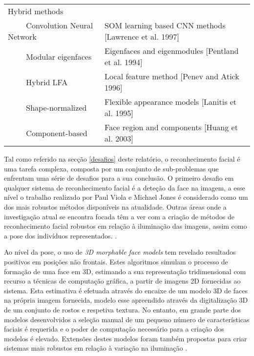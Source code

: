 \begin{center}
\begin{table}
\begin{tabular}{l p{8cm}}
Hybrid methods \\
$\qquad$        Convolution Neural Network & SOM learning based CNN methods [Lawrence et al. 1997] \\ 
$\qquad$        Modular eigenfaces         & Eigenfaces and eigenmodules [Pentland et al. 1994] \\ 
$\qquad$        Hybrid LFA                 & Local feature method [Penev and Atick 1996] \\ 
$\qquad$        Shape-normalized           & Flexible appearance models [Lanitis et al. 1995] \\ 
$\qquad$        Component-based            & Face region and components [Huang et al. 2003] \\
        \hline
    \end{tabular}
	\label{tabelaZhao}
\end{table}
\end{center}
 
 Tal como referido na secção \ref{desafios} deste relatório, o reconhecimento facial é uma tarefa complexa, composta por um conjunto de sub-problemas que enfrentam uma série de desafios para a sua conclusão. O primeiro desafio em qualquer sistema de reconhecimento facial é a deteção da face na imagem, a esse nível o trabalho realizado por Paul Viola e Michael Jones \citep{Viola2004} é considerado como um dos mais robustos métodos disponíveis na atualidade. Outras áreas onde a investigação atual se encontra focada têm a ver com a criação de métodos de reconhecimento facial robustos em relação à iluminação das imagens, assim como a pose dos indivíduos representados. \citep{Chellappa2010}.
 
 Ao nível da pose, o uso de  \textit{3D morphable face models} \cite{Blanz2003} tem revelado resultados positivos em posições não frontais. Estes algoritmos simulam o processo de formação de uma face em 3D, estimando a sua representação tridimensional com recurso a técnicas de computação gráfica, a partir de imagens 2D fornecidas ao sistema. Esta estimativa é efetuada através do encaixe de um modelo 3D de faces na própria imagem fornecida, modelo esse apreendido através da digitalização 3D de um conjunto de rostos e respetiva textura. No entanto, em grande parte dos modelos desenvolvidos a seleção manual de um pequeno número de características faciais é requerida e o poder de computação necessário para a criação dos modelos é elevado. Extensões destes modelos foram também propostas para criar sistemas mais robustos em relação à variação na iluminação \citep{Chellappa2010}.  
 
